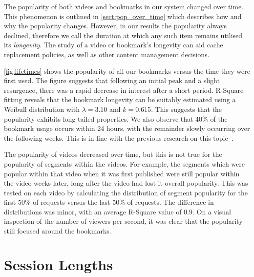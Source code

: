 The popularity of both videos and bookmarks in our system changed over time. This phenomenon is outlined in \autoref{sect:pop_over_time} which describes how and why the popularity changes. However, in our results the popularity always declined, therefore we call the duration at which any such item remains utilised its \emph{longevity}. The study of a video or bookmark's longevity can aid cache replacement policies, as well as other content management decisions.

\autoref{fig:lifetimes} shows the popularity of all our bookmarks versus the time they were first used. The figure suggests that following an initial peak and a slight resurgence, there was a rapid decrease in interest after a short period. R-Square fitting reveals that the bookmark longevity can be suitably estimated using a Weibull distribution with $\lambda=3.10$ and $k=0.615$. This suggests that the popularity exhibits long-tailed properties. We also observe that 40\% of the bookmark usage occurs within 24 hours, with the remainder slowly occurring over the following weeks. This is in line with the previous research on this topic~\cite{cherkasova2004aoe}.

The popularity of videos decreased over time, but this is not true for the popularity of segments within the videos. For example, the segments which were popular within that video when it was first published were still popular within the video weeks later, long after the video had lost it overall popularity. This was tested on each video by calculating the distribution of segment popularity for the first 50\% of requests versus the last 50\% of requests. The difference in distributions was minor, with an average R-Square value of 0.9. On a visual inspection of the number of viewers per second, it was clear that the popularity still focused around the bookmarks.

\section{Session Lengths}

